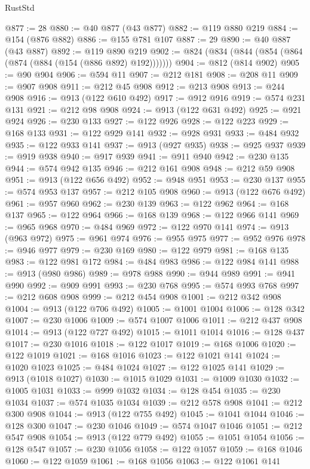\begin{lexlean}{RustStd}
\begin{coremodule}
{\begin{coremodule}
{{{{{{{{{{{{{{{{{{{{{{{{{{{{{{{{{{{{{{{{{{{{{{{@877 := 28
@880 := @40 @877 (@43 @877)
@882 := @119 @880 @219
@884 := @154 (@876 @882)
@886 := @155 @781 @107
@887 := 29
@890 := @40 @887 (@43 @887)
@892 := @119 @890 @219
@902 := @824 (@834 (@844 (@854 (@864 (@874 (@884 (@154 (@886 @892) @192)))))))
@904 := @812 (@814 @902)
@905 := @90 @904
@906 := @594 @11
@907 := @212 @181
@908 := @208 @11
@909 := @907 @908
@911 := @212 @45 @908
@912 := @213 @908
@913 := @244 @908
@916 := @913 (@122 @610 @492)
@917 := @912 @916
@919 := @574 @231 @131
@921 := @212 @98 @908
@924 := @913 (@122 @631 @492)
@925 := @921 @924
@926 := @230 @133
@927 := @122 @926
@928 := @122 @223
@929 := @168 @133
@931 := @122 @929 @141
@932 := @928 @931
@933 := @484 @932
@935 := @122 @933 @141
@937 := @913 (@927 @935)
@938 := @925 @937
@939 := @919 @938
@940 := @917 @939
@941 := @911 @940
@942 := @230 @135
@944 := @574 @942 @135
@946 := @212 @161 @908
@948 := @212 @59 @908
@951 := @913 (@122 @656 @492)
@952 := @948 @951
@953 := @230 @137
@955 := @574 @953 @137
@957 := @212 @105 @908
@960 := @913 (@122 @676 @492)
@961 := @957 @960
@962 := @230 @139
@963 := @122 @962
@964 := @168 @137
@965 := @122 @964
@966 := @168 @139
@968 := @122 @966 @141
@969 := @965 @968
@970 := @484 @969
@972 := @122 @970 @141
@974 := @913 (@963 @972)
@975 := @961 @974
@976 := @955 @975
@977 := @952 @976
@978 := @946 @977
@979 := @230 @169
@980 := @122 @979
@981 := @168 @135
@983 := @122 @981 @172
@984 := @484 @983
@986 := @122 @984 @141
@988 := @913 (@980 @986)
@989 := @978 @988
@990 := @944 @989
@991 := @941 @990
@992 := @909 @991
@993 := @230 @768
@995 := @574 @993 @768
@997 := @212 @608 @908
@999 := @212 @454 @908
@1001 := @212 @342 @908
@1004 := @913 (@122 @706 @492)
@1005 := @1001 @1004
@1006 := @128 @342
@1007 := @230 @1006
@1009 := @574 @1007 @1006
@1011 := @212 @437 @908
@1014 := @913 (@122 @727 @492)
@1015 := @1011 @1014
@1016 := @128 @437
@1017 := @230 @1016
@1018 := @122 @1017
@1019 := @168 @1006
@1020 := @122 @1019
@1021 := @168 @1016
@1023 := @122 @1021 @141
@1024 := @1020 @1023
@1025 := @484 @1024
@1027 := @122 @1025 @141
@1029 := @913 (@1018 @1027)
@1030 := @1015 @1029
@1031 := @1009 @1030
@1032 := @1005 @1031
@1033 := @999 @1032
@1034 := @128 @454
@1035 := @230 @1034
@1037 := @574 @1035 @1034
@1039 := @212 @578 @908
@1041 := @212 @300 @908
@1044 := @913 (@122 @755 @492)
@1045 := @1041 @1044
@1046 := @128 @300
@1047 := @230 @1046
@1049 := @574 @1047 @1046
@1051 := @212 @547 @908
@1054 := @913 (@122 @779 @492)
@1055 := @1051 @1054
@1056 := @128 @547
@1057 := @230 @1056
@1058 := @122 @1057
@1059 := @168 @1046
@1060 := @122 @1059
@1061 := @168 @1056
@1063 := @122 @1061 @141
}}}}}}}}}}}}}}}}}}}}}}}}}}}}}}}}}}}}}}}}}}}}}}}
\end{coremodule}}
\end{coremodule}
\end{lexlean}
